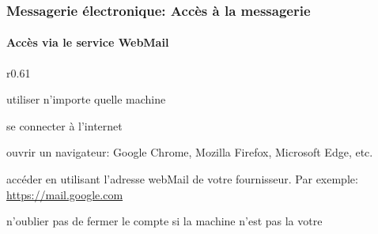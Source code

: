 \documentclass[xcolor=table]{beamer}
\begin{document}
\begin{frame}
\frametitle{Messagerie électronique: Accès à la messagerie}
\framesubtitle{Accès via le service WebMail}

\begin{wrapfigure}{r}{0.61\textwidth}
	\vspace{-1cm}
	\vspace{-1cm}
\end{wrapfigure}


\mysphere utiliser n'importe quelle machine

\mysphere se connecter à l'internet

\mysphere ouvrir un navigateur: Google Chrome, Mozilla Firefox, Microsoft Edge, etc.  

\mysphere accéder en utilisant l'adresse webMail de votre fournisseur. 
Par exemple: \url{https://mail.google.com}

\mysphere n'oublier pas de fermer le compte si la machine n'est pas la votre



\end{frame}
\end{document}
